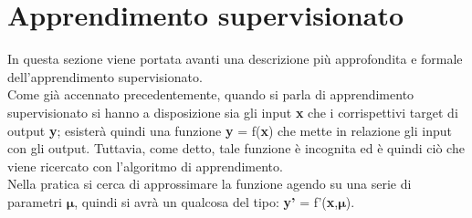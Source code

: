 %
\section{Apprendimento supervisionato}
\label{sec:apprendimento supervisionato}
In questa sezione viene portata avanti una descrizione più approfondita e formale dell'apprendimento supervisionato.\\
Come già accennato precedentemente, quando si parla di apprendimento supervisionato si hanno a disposizione sia gli input \textbf{x} che i corrispettivi target di output \textbf{y}; esisterà quindi una funzione 
\textbf{y} = f(\textbf{x}) che mette in relazione gli input con gli output. Tuttavia, come detto, tale funzione è incognita ed è quindi ciò che viene ricercato con l'algoritmo di apprendimento.\\
Nella pratica si cerca di approssimare la funzione agendo su una serie di parametri $\bm{\mu}$, quindi si avrà un qualcosa del tipo: \textbf{y'} = f'(\textbf{x},$\bm{\mu}$).


%
